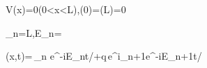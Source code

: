 V(x)=0\quad(0<x<L),\qquad \psi(0)=\psi(L)=0

\psi_n=\sin{}L,\qquad E_n=

\psi(x,t)=\,\psi_n e^{-iE_nt/\hbar}+\sqrt q\,e^{i\varphi}\psi_{n+1}e^{-iE_{n+1}t/\hbar}
